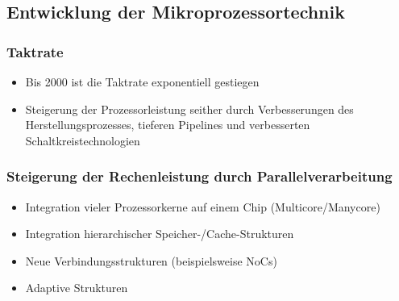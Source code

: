 \subsection{Entwicklung der Mikroprozessortechnik}

\subsubsection{Taktrate}
\begin{itemize}
	\item Bis 2000 ist die Taktrate exponentiell gestiegen
	\item Steigerung der Prozessorleistung seither durch Verbesserungen des Herstellungsprozesses, tieferen Pipelines und verbesserten Schaltkreistechnologien
\end{itemize}

\subsubsection{Steigerung der Rechenleistung durch Parallelverarbeitung}
\begin{itemize}
	\item Integration vieler Prozessorkerne auf einem Chip (Multicore/Manycore)
	\item Integration hierarchischer Speicher-/Cache-Strukturen
	\item Neue Verbindungsstrukturen (beispielsweise NoCs)
	\item Adaptive Strukturen
\end{itemize}


